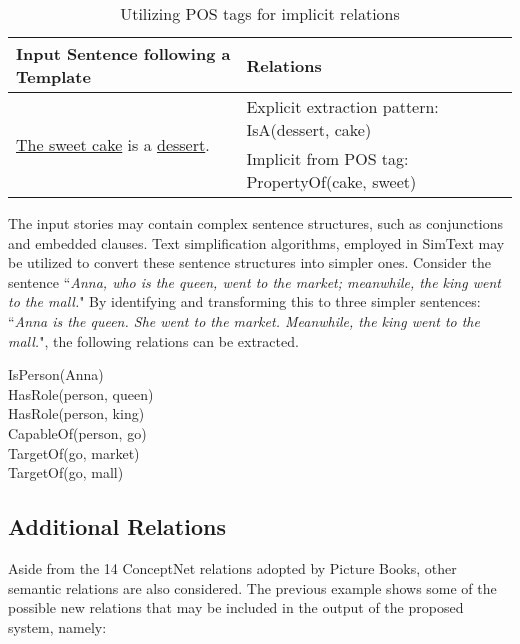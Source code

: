 \begin{table}[ht]   %
\centering
\caption{Utilizing POS tags for implicit relations} \vspace{0.25em}
\begin{tabular}{|l|p{6cm}|} \hline
Input Sentence following a Template & Relations \\ \hline
\multirow{2}{*}{\underline{The sweet cake} is a \underline{dessert}.} & Explicit extraction pattern: IsA(dessert, cake) \\
 & Implicit from POS tag: PropertyOf(cake, sweet) \\ \hline
\end{tabular}
\label{tab:utilizeposforimplicit}
\end{table}

The input stories may contain complex sentence structures, such as conjunctions and embedded clauses. Text simplification algorithms, employed in SimText \cite{Damay:2007} may be utilized to convert these sentence structures into simpler ones. Consider the sentence ``\textit{Anna, who is the queen, went to the market; meanwhile, the king went to the mall.}" By identifying and transforming this to three simpler sentences: ``\textit{Anna is the queen. She went to the market. Meanwhile, the king went to the mall.}", the following relations can be extracted. 

\noindent
	\hspace{1 in}IsPerson(Anna) \\
	\hspace*{1 in}HasRole(person, queen) \\
	\hspace*{1 in}HasRole(person, king) \\
	\hspace*{1 in}CapableOf(person, go) \\
	\hspace*{1 in}TargetOf(go, market) \\
	\hspace*{1 in}TargetOf(go, mall)
	
\subsection{Additional Relations}
\label{sec:addrelations}
	
Aside from the 14 ConceptNet relations adopted by Picture Books, other semantic relations are also considered. The previous example shows some of the possible new relations that may be included in the output of the proposed system, namely:

